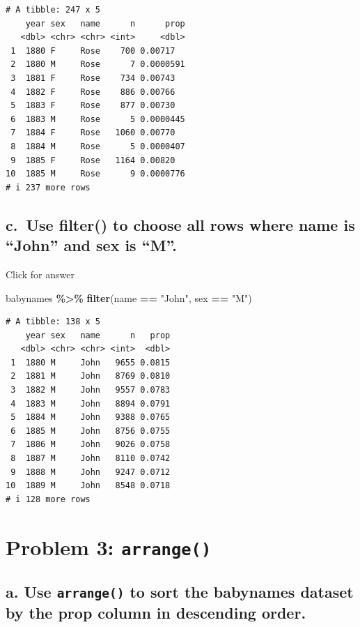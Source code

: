\documentclass[
]{book}
\newenvironment{Shaded}{\begin{snugshade}}{\end{snugshade}}
\newcommand{\FunctionTok}[1]{\textcolor[rgb]{0.13,0.29,0.53}{\textbf{#1}}}
\newcommand{\NormalTok}[1]{#1}
\newcommand{\SpecialCharTok}[1]{\textcolor[rgb]{0.81,0.36,0.00}{\textbf{#1}}}
\newcommand{\StringTok}[1]{\textcolor[rgb]{0.31,0.60,0.02}{#1}}
\begin{document}
\begin{verbatim}
# A tibble: 247 x 5
    year sex   name      n      prop
   <dbl> <chr> <chr> <int>     <dbl>
 1  1880 F     Rose    700 0.00717  
 2  1880 M     Rose      7 0.0000591
 3  1881 F     Rose    734 0.00743  
 4  1882 F     Rose    886 0.00766  
 5  1883 F     Rose    877 0.00730  
 6  1883 M     Rose      5 0.0000445
 7  1884 F     Rose   1060 0.00770  
 8  1884 M     Rose      5 0.0000407
 9  1885 F     Rose   1164 0.00820  
10  1885 M     Rose      9 0.0000776
# i 237 more rows
\end{verbatim}

\hypertarget{c.-use-filter-to-choose-all-rows-where-name-is-john-and-sex-is-m.}{%
\subsection{c.~Use filter() to choose all rows where name is ``John'' and sex is ``M''.}\label{c.-use-filter-to-choose-all-rows-where-name-is-john-and-sex-is-m.}}

Click for answer

\begin{Shaded}
\begin{Highlighting}[]
\NormalTok{babynames }\SpecialCharTok{\%\textgreater{}\%} \FunctionTok{filter}\NormalTok{(name }\SpecialCharTok{==} \StringTok{"John"}\NormalTok{, sex }\SpecialCharTok{==} \StringTok{"M"}\NormalTok{)}
\end{Highlighting}
\end{Shaded}

\begin{verbatim}
# A tibble: 138 x 5
    year sex   name      n   prop
   <dbl> <chr> <chr> <int>  <dbl>
 1  1880 M     John   9655 0.0815
 2  1881 M     John   8769 0.0810
 3  1882 M     John   9557 0.0783
 4  1883 M     John   8894 0.0791
 5  1884 M     John   9388 0.0765
 6  1885 M     John   8756 0.0755
 7  1886 M     John   9026 0.0758
 8  1887 M     John   8110 0.0742
 9  1888 M     John   9247 0.0712
10  1889 M     John   8548 0.0718
# i 128 more rows
\end{verbatim}

\hypertarget{problem-3-arrange}{%
\section{\texorpdfstring{Problem 3: \texttt{arrange()}}{Problem 3: arrange()}}\label{problem-3-arrange}}

\hypertarget{a.-use-arrange-to-sort-the-babynames-dataset-by-the-prop-column-in-descending-order.}{%
\subsection{\texorpdfstring{a. Use \texttt{arrange()} to sort the babynames dataset by the prop column in descending order.}{a. Use arrange() to sort the babynames dataset by the prop column in descending order.}}\label{a.-use-arrange-to-sort-the-babynames-dataset-by-the-prop-column-in-descending-order.}}
\end{document}
